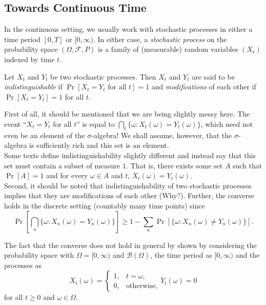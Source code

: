 	\subsection{Towards Continuous Time}

		In the continuous setting, we usually work with stochastic processes in either a time period $[0,T]$ or $[0,\infty)$. In either case, a \textit{stochastic process} on the probability space $(\Omega,\mathcal{F},P)$ is a family of (measurable) random variables $(X_t)$ indexed by time $t$.

		\begin{definition}
			\label{def: modification indisting}
			Let $X_t$ and $Y_t$ be two stochastic processes. Then $X_t$ and $Y_t$ are said to be \textit{indistinguishable} if $\Pr[X_t=Y_t\text{ for all }t]=1$ and \textit{modifications} of each other if $\Pr[X_t=Y_t]=1$ for all $t$.
		\end{definition}

		First of all, it should be mentioned that we are being slightly messy here. The event ``$X_t=Y_t$ for all $t$'' is equal to $\bigcap_t \{\omega : X_t(\omega)=Y_t(\omega)\}$, which need not even be an element of the $\sigma$-algebra! We shall assume, however, that the $\sigma$-algebra is sufficiently rich and this set is an element.\\
		Some texts define indistinguishability slightly different and instead say that this set must contain a subset of measure $1$. That is, there exists some set $A$ such that $\Pr[A]=1$ and for every $\omega\in A$ and $t$, $X_t(\omega)=Y_t(\omega)$.\\

		Second, it should be noted that indistinguishability of two stochastic processes implies that they are modifications of each other (Why?). Further, the converse holds in the discrete setting (countably many time points) since
		\[ \Pr\left[\bigcap_n \{\omega : X_n(\omega)=Y_n(\omega)\}\right] \geq 1 - \sum_{n} \Pr\left[\{\omega : X_n(\omega)\neq Y_n(\omega)\}\right]. \]

		The fact that the converse does not hold in general by shown by considering the probability space with $\Omega = [0,\infty)$ and $\mathcal{B}(\Omega)$, the time period as $[0,\infty)$ and the processes as
		\[
			X_t(\omega) = 
			\begin{cases}
				1, & t=\omega, \\
				0, & \text{otherwise},
			\end{cases}
			Y_t(\omega) = 0
		\]
		for all $t\geq 0$ and $\omega\in\Omega$.\\

